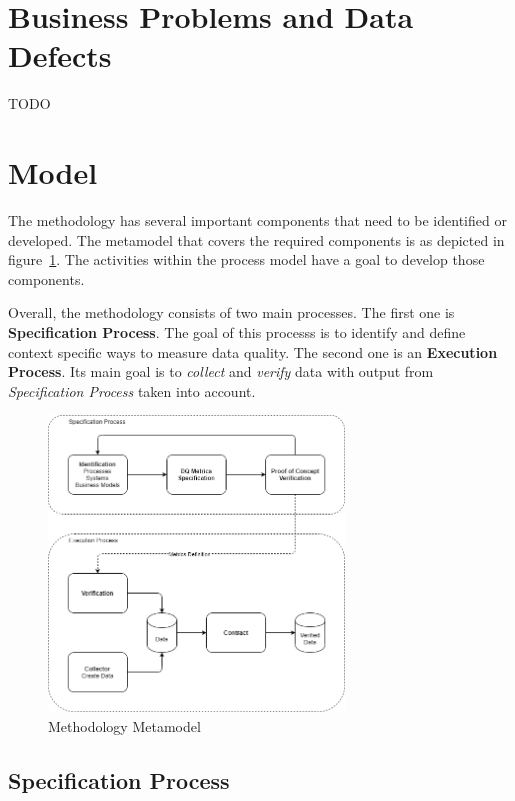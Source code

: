 \section{Business Problems and Data Defects}

TODO

\section{Model}

The methodology has several important components that need to be identified or developed.
The metamodel that covers the required components is as depicted in figure~\ref{fig:methodology-metamodel}.
The activities within the process model have a goal to develop those components.

Overall, the methodology consists of two main processes.
The first one is \textbf{Specification Process}.
The goal of this processs is to identify and define context specific ways to measure data quality.
The second one is an \textbf{Execution Process}.
Its main goal is to \textit{collect} and \textit{verify} data with output from \textit{Specification Process} taken into account.

\begin{figure}[htb]
    \centering
    \includegraphics[width=0.7\textwidth]{figures/dq-methodology.png}
    \caption{Methodology Metamodel}
    \label{fig:methodology-metamodel}
\end{figure}
\FloatBarrier

\subsection{Specification Process}

